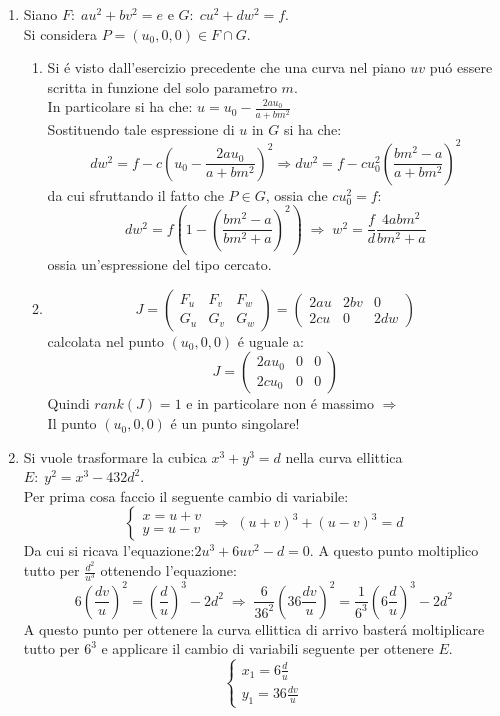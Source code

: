 \documentclass[a4paper]{article}
\newcommand{\bm}{ \begin{pmatrix} }
\newcommand{\edm}{ \end{pmatrix} }
\newcommand{\sist}{\begin{cases}}
\newcommand{\esist}{\end{cases}}
\newcommand{\ds}{\displaystyle}
\begin{document}
\begin{enumerate}
\item Siano $F:\; au^2+bv^2=e$ e $G:\; cu^2+dw^2=f$.\\
Si considera $P=(u_0,0,0)\in F\cap G$.
\begin{enumerate}
\item Si \'e visto dall'esercizio precedente che una curva nel piano $uv$ pu\'o essere scritta in funzione del solo parametro $m$.\\
In particolare si ha che:
$u=\ds{u_0-\frac{2au_0}{a+bm^2}}$ \\
Sostituendo tale espressione di $u$ in $G$ si ha che:
$$dw^2=f-c\ds{\left(u_0-\frac{2au_0}{a+bm^2}\right)^2} \Rightarrow dw^2=f-c u_0^2\ds{\left(\frac{bm^2-a}{a+bm^2}\right)^2}$$
da cui sfruttando il fatto che $P\in G$, ossia che $c u_0^2=f$:
$$d w^2=f\ds{\left(1-\left(\frac{bm^2-a}{bm^2+a}\right)^2\right)}\;\Rightarrow\;
w^2=\ds{\frac{f}{d}\frac{4abm^2}{bm^2+a}}$$
ossia un'espressione del tipo cercato.

\item $$J=\bm F_u & F_v & F_w \\ G_u & G_v & G_w \edm = 
\bm 2au & 2bv & 0 \\ 2cu & 0 & 2dw \edm$$
calcolata nel punto $(u_0,0,0)$ \'e uguale a:
$$J=\bm 2au_0 & 0 & 0 \\ 2cu_0 & 0 & 0\edm$$
Quindi $rank(J)=1$ e in particolare non \'e massimo $\Rightarrow$\\
Il punto $(u_0,0,0)$ \'e un punto singolare! 
\end{enumerate}





\item Si vuole trasformare la cubica $x^3+y^3=d$ nella curva ellittica \\
$E:\; y^2=x^3-432d^2$.\\
Per prima cosa faccio il seguente cambio di variabile:
$$\sist
x=u+v\\
y=u-v
\esist  \;\Rightarrow\; (u+v)^3 + (u-v)^3 = d$$
Da cui si ricava l'equazione:$2u^3+6uv^2-d=0$. A questo punto moltiplico tutto per $\ds{\frac{d^2}{u^3}}$ ottenendo l'equazione: 
$$\ds{6\left(\frac{dv}{u}\right)^2=\left(\frac{d}{u}\right)^3-2d^2}\;\Rightarrow\;
\ds{\frac{6}{36^2}\left(36\frac{dv}{u}\right)^2=\frac{1}{6^3}\left(6\frac{d}{u}\right)^3-2d^2}$$
A questo punto per ottenere la curva ellittica di arrivo baster\'a  moltiplicare tutto per $6^3$ e applicare il cambio di variabili seguente per ottenere $E$.
$$\sist
x_1=6\ds{\frac{d}{u}}\\
y_1=36\ds{\frac{dv}{u}}
\esist   $$


\end{enumerate}
\end{document}
